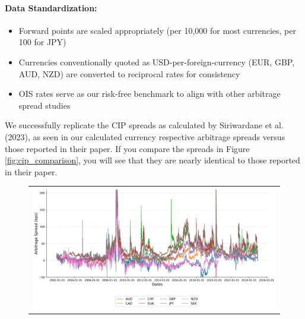 \documentclass{article}
\begin{document}
\begin{appendices}
\paragraph{Data Standardization:}
\begin{itemize}
    \item Forward points are scaled appropriately (per 10,000 for most currencies, per 100 for JPY)
    \item Currencies conventionally quoted as USD-per-foreign-currency (EUR, GBP, AUD, NZD) are converted to reciprocal rates for consistency
    \item OIS rates serve as our risk-free benchmark to align with other arbitrage spread studies
\end{itemize}

We successfully replicate the CIP spreads as calculated by Siriwardane et al. (2023),
as seen in 
our calculated currency respective
arbitrage spreads versus those reported in their paper. If you compare
the spreads in Figure \ref{fig:cip_comparison}, you will see that they are nearly identical
to those reported in their paper.

\begin{figure}
  \centering


  \begin{tabular}{@{}c@{}}
    \includegraphics[width=.99\linewidth]{../docs_src/CIP_replicate.png} 
  \end{tabular}


\end{figure}
\end{appendices}
\end{document}
